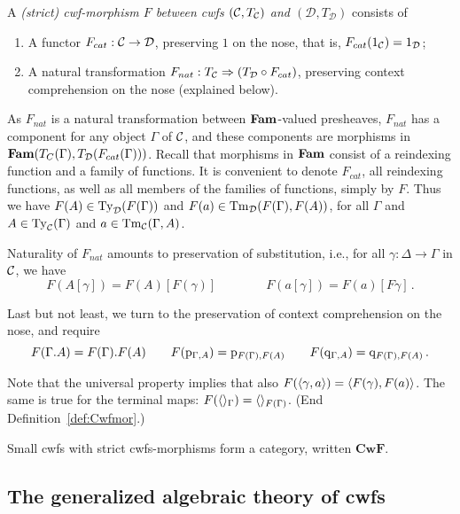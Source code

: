 \documentclass{lmcs}
\def\D{\mathcal{D}}
\def\Cwf{\mathbf{CwF}}
\begin{document}
\begin{definition}\label{def:Cwfmor}  
A \emph{(strict) cwf-morphism $F$ between cwfs $({\mathcal C},T_{\mathcal C})$ and $(\D,T_\D)$}
consists of

\begin{enumerate}

\item A functor $F_{cat} : \C \to \D$, preserving $1$ on the nose,
that is, $F_{cat}(1_{\C}) = 1_{\D}$;

\item A natural transformation $F_{nat} : T_\C \Rightarrow (T_\D \circ F_{cat})$,
preserving context comprehension on the nose (explained below).

\end{enumerate}
 
As $F_{nat}$ is a natural transformation between $\textbf{Fam}$-valued presheaves,
$F_{nat}$ has a component for any object $\Gamma$ of ${\mathcal C}$, and
these components are morphisms in $\Fam(T_C(\Gamma),T_\D(F_{cat}(\Gamma)))$.
Recall that morphisms in $\textbf{Fam}$ consist of a reindexing function
and a family of functions. It is convenient to denote $F_{cat}$,
all reindexing functions, as well as all members of the families of functions,
simply by $F$. Thus we have $F(A) \in \Ty_\D(F(\Gamma))$ 
and $F(a) \in \Tm_\D(F(\Gamma), F(A))$, for all $\Gamma$
and $A\in\mathrm{Ty}_{\mathcal C}(\Gamma)$ and $a\in \mathrm{Tm}_{\mathcal C}(\Gamma, A)$.

Naturality of $F_{nat}$
amounts to preservation of substitution, {i.e.}, for all 
$\gamma : \Delta \to \Gamma$ in ${\mathcal C}$, we have
\[
F(A[\gamma]) = F(A)[F(\gamma)] \qquad \qquad 
F(a[\gamma]) = F(a)[F\gamma]\,.
\]

Last but not least, we turn to the preservation of context comprehension
on the nose, and require
\[ 
F(\Gamma. A) = F(\Gamma). F(A) \qquad
F(\mathrm{p}_{\Gamma, A}) = \mathrm{p}_{F(\Gamma), F(A)} \qquad
F(\mathrm{q}_{\Gamma, A}) = \mathrm{q}_{F(\Gamma), F(A)}\,.
\]

Note that the universal property implies that also
$F(\langle \gamma,a \rangle) = \langle F(\gamma),F(a) \rangle$.
The same is true for the terminal maps:
$F(\langle  \rangle_\Gamma) = \langle  \rangle_{F(\Gamma)}$.
(End Definition~\ref{def:Cwfmor}.)
\end{definition}

Small cwfs with strict cwfs-morphisms form a category, written $\Cwf$. 

\subsection{The generalized algebraic theory of cwfs}
\end{document}
